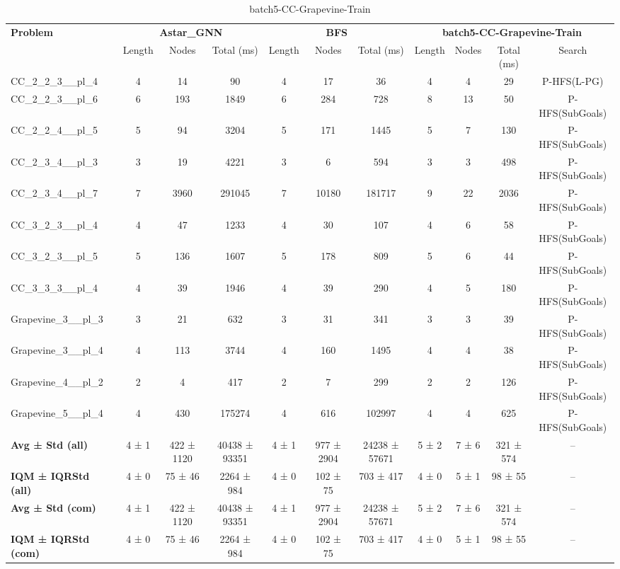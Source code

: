 \begin{table}[!ht]
\centering
\scriptsize
\begin{tabular}{l|ccc|ccc|cccc}
\multirow{2}{*}{\textbf{Problem}} & \multicolumn{3}{c|}{\textbf{Astar\_GNN}} & \multicolumn{3}{c|}{\textbf{BFS}} & \multicolumn{4}{c}{\textbf{batch5-CC-Grapevine-Train}} \\
\cline{2-11}
& Length & Nodes & Total (ms) & Length & Nodes & Total (ms) & Length & Nodes & Total (ms) & Search \\
\hline
CC\_2\_2\_3\_\_pl\_4 & 4 & 14 & 90 & 4 & 17 & 36 & 4 & 4 & 29 & P-HFS(L-PG) \\
CC\_2\_2\_3\_\_pl\_6 & 6 & 193 & 1849 & 6 & 284 & 728 & 8 & 13 & 50 & P-HFS(SubGoals) \\
CC\_2\_2\_4\_\_pl\_5 & 5 & 94 & 3204 & 5 & 171 & 1445 & 5 & 7 & 130 & P-HFS(SubGoals) \\
CC\_2\_3\_4\_\_pl\_3 & 3 & 19 & 4221 & 3 & 6 & 594 & 3 & 3 & 498 & P-HFS(SubGoals) \\
CC\_2\_3\_4\_\_pl\_7 & 7 & 3960 & 291045 & 7 & 10180 & 181717 & 9 & 22 & 2036 & P-HFS(SubGoals) \\
CC\_3\_2\_3\_\_pl\_4 & 4 & 47 & 1233 & 4 & 30 & 107 & 4 & 6 & 58 & P-HFS(SubGoals) \\
CC\_3\_2\_3\_\_pl\_5 & 5 & 136 & 1607 & 5 & 178 & 809 & 5 & 6 & 44 & P-HFS(SubGoals) \\
CC\_3\_3\_3\_\_pl\_4 & 4 & 39 & 1946 & 4 & 39 & 290 & 4 & 5 & 180 & P-HFS(SubGoals) \\
Grapevine\_3\_\_pl\_3 & 3 & 21 & 632 & 3 & 31 & 341 & 3 & 3 & 39 & P-HFS(SubGoals) \\
Grapevine\_3\_\_pl\_4 & 4 & 113 & 3744 & 4 & 160 & 1495 & 4 & 4 & 38 & P-HFS(SubGoals) \\
Grapevine\_4\_\_pl\_2 & 2 & 4 & 417 & 2 & 7 & 299 & 2 & 2 & 126 & P-HFS(SubGoals) \\
Grapevine\_5\_\_pl\_4 & 4 & 430 & 175274 & 4 & 616 & 102997 & 4 & 4 & 625 & P-HFS(SubGoals) \\
\hline
\textbf{Avg ± Std (all)} & 4 ± 1 & 422 ± 1120 & 40438 ± 93351 & 4 ± 1 & 977 ± 2904 & 24238 ± 57671 & 5 ± 2 & 7 ± 6 & 321 ± 574 & -- \\
\textbf{IQM ± IQRStd (all)} & 4 ± 0 & 75 ± 46 & 2264 ± 984 & 4 ± 0 & 102 ± 75 & 703 ± 417 & 4 ± 0 & 5 ± 1 & 98 ± 55 & -- \\
\textbf{Avg ± Std (com)} & 4 ± 1 & 422 ± 1120 & 40438 ± 93351 & 4 ± 1 & 977 ± 2904 & 24238 ± 57671 & 5 ± 2 & 7 ± 6 & 321 ± 574 & -- \\
\textbf{IQM ± IQRStd (com)} & 4 ± 0 & 75 ± 46 & 2264 ± 984 & 4 ± 0 & 102 ± 75 & 703 ± 417 & 4 ± 0 & 5 ± 1 & 98 ± 55 & -- \\
\end{tabular}
\caption{batch5-CC-Grapevine-Train}
\label{tab:batch5_CC-Grapevine_comparison_train}
\end{table}
